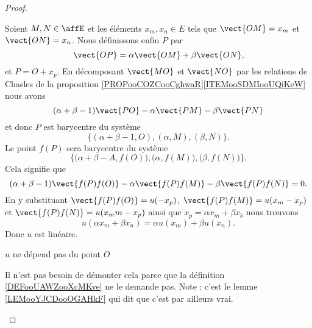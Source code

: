 \begin{proof}
\begin{subproof}
\begin{subproof}
                Soient \( M,N\in\affE\) et les éléments \( x_m,x_n\in E\) tels que \( \vect{ OM }=x_m\) et \( \vect{ ON }=x_n\). Nous définissons enfin \( P\) par
                \begin{equation}
                    \vect{ OP }=\alpha \vect{ OM }+\beta\vect{ ON },
                \end{equation}
                et \( P=O+x_p\). En décomposant \( \vect{ MO }\) et \( \vect{ NO }\) par les relations de Chasles de la proposition \ref{PROPooCOZCooCghwaR}\ref{ITEMooSDMIooUQiKeW} nous avons
                \begin{equation}
                    (\alpha+\beta-1)\vect{ PO }-\alpha\vect{ PM }-\beta\vect{ PN }
                \end{equation}
                et donc \( P\) est barycentre du système
                \begin{equation}
                    \big\{ (\alpha+\beta-1,O),(\alpha,M),(\beta,N) \}.
                \end{equation}
                Le point \( f(P)\) sera barycentre du système
                \begin{equation}
                    \Big\{ \big( \alpha+\beta-A,f(O) \big),\big( \alpha,f(M) \big), \big( \beta,f(N) \big) \}.
                \end{equation}
                Cela signifie que
                \begin{equation}
                    (\alpha+\beta-1)\vect{ f(P)f(O) }-\alpha\vect{ f(P)f(M) }-\beta\vect{ f(P)f(N) }=0.
                \end{equation}
                En y substituant \( \vect{ f(P)f(O) }=u(-x_p)\), \( \vect{ f(P)f(M) }=u(x_m-x_p)\) et \( \vect{ f(P)f(N) }=u(x_mm-x_p)\) ainsi que \( x_p=\alpha x_m+\beta x_b\) nous trouvons
                \begin{equation}
                    u(\alpha x_m+\beta x_n)=\alpha u(x_m)+\beta u(x_n).
                \end{equation}
                Donc \( u\) est linéaire. 

            \item[\( u\) ne dépend pas du point \( O\)]

                Il n'est pas besoin de démonter cela parce que la définition \ref{DEFooUAWZooXcMKve} ne le demande pas. Note : c'est le lemme \ref{LEMooYJCDooOGAHkF} qui dit que c'est par ailleurs vrai.
            \end{subproof}
    \end{subproof}
\end{proof}

